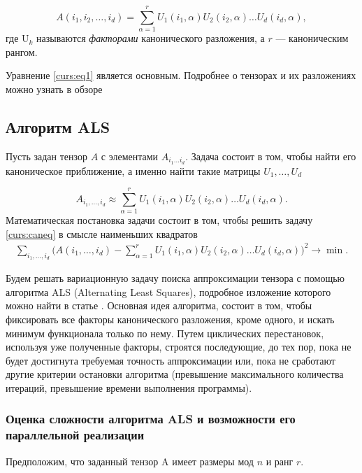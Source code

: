 \documentclass{scrartcl}
\begin{document}
\begin{equation}\label{curs:eq1}
A(i_1,i_2,\ldots,i_d) = \sum_{\alpha=1}^r U_1(i_1,\alpha) U_2(i_2,\alpha) \ldots U_d(i_d,\alpha),
\end{equation}
где U$_k$ называются \emph{факторами} канонического разложения, а $r$ --- каноническим рангом.

Уравнение \eqref{curs:eq1} является основным. Подробнее о тензорах и их разложениях можно узнать в обзоре \cite{kolda2009tensor}
\subsection{Алгоритм ALS}
\label{sec-5-1}

  Пусть задан тензор $A$ с элементами $A_{i_1 \ldots i_d}$. Задача состоит в том, чтобы найти его
  каноническое приближение, а именно найти такие матрицы $U_1,\ldots,U_d$

\begin{equation}\label{curs:caneq}
A_{i_1,\ldots,i_d} \approx  \sum_{\alpha=1}^r U_1(i_1,\alpha) U_2(i_2,\alpha) \ldots U_d(i_d,\alpha).
\end{equation}
Математическая постановка задачи состоит в том, чтобы решить задачу
\eqref{curs:caneq} в смысле наименьших квадратов
\begin{align}
\sum_{i_1,\ldots,i_d} \Big(A(i_1,\ldots,i_d)-
\sum_{\alpha=1}^r U_1(i_1,\alpha) U_2(i_2,\alpha) \ldots
U_d(i_d,\alpha)\Big) ^2
\longrightarrow \min.
\end{align}

Будем решать вариационную задачу поиска аппроксимации тензора с помощью алгоритма ALS
(Alternating Least Squares), подробное изложение которого можно найти в статье \cite{carroll1970analysis}.
Основная идея алгоритма, состоит в том, чтобы фиксировать все факторы  канонического разложения,
кроме одного, и искать минимум функционала только по нему.
Путем циклических перестановок, используя уже полученные факторы, строятся последующие, до тех пор,
пока не будет достигнута требуемая точность аппроксимации или, пока не сработают другие критерии
остановки алгоритма (превышение максимального количества итераций,
превышение времени выполнения программы).
\subsubsection{Оценка сложности алгоритма ALS и возможности его параллельной реализации}
\label{sec-5-1-1}

  Предположим, что заданный тензор A имеет размеры мод $n$ и ранг $r$.
\end{document}
